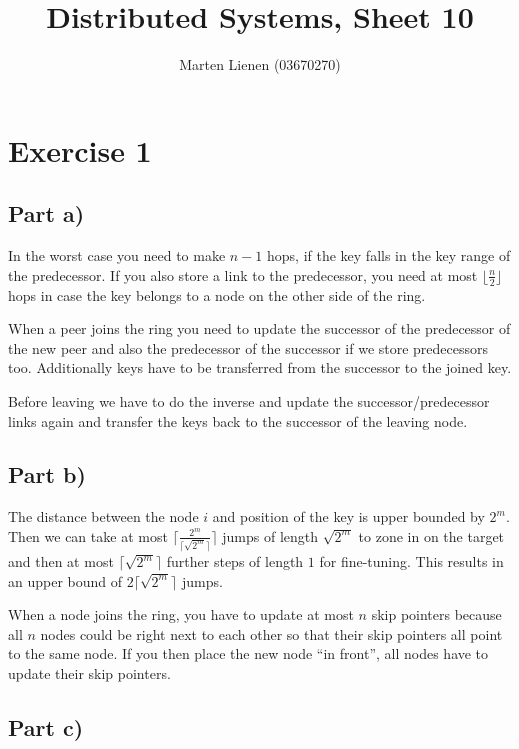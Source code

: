 \documentclass[10pt,a4paper]{article}
\title{Distributed Systems, Sheet 10}
\author{Marten Lienen (03670270)}
\begin{document}
\maketitle

\section*{Exercise 1}

\subsection*{Part a)}

In the worst case you need to make $n - 1$ hops, if the key falls in the key range of the predecessor.
If you also store a link to the predecessor, you need at most $\lfloor \frac{n}{2} \rfloor$ hops in case the key belongs to a node on the other side of the ring.

When a peer joins the ring you need to update the successor of the predecessor of the new peer and also the predecessor of the successor if we store predecessors too.
Additionally keys have to be transferred from the successor to the joined key.

Before leaving we have to do the inverse and update the successor/predecessor links again and transfer the keys back to the successor of the leaving node.

\subsection*{Part b)}

The distance between the node $i$ and position of the key is upper bounded by $2^{m}$.
Then we can take at most $\lceil\frac{2^{m}}{\lceil \sqrt{2^{m}} \rceil}\rceil$ jumps of length $\sqrt{2^{m}}$ to zone in on the target and then at most $\lceil \sqrt{2^{m}} \rceil$ further steps of length $1$ for fine-tuning.
This results in an upper bound of $2 \lceil \sqrt{2^{m}} \rceil$ jumps.

When a node joins the ring, you have to update at most $n$ skip pointers because all $n$ nodes could be right next to each other so that their skip pointers all point to the same node.
If you then place the new node ``in front'', all nodes have to update their skip pointers.

\subsection*{Part c)}
\end{document}
